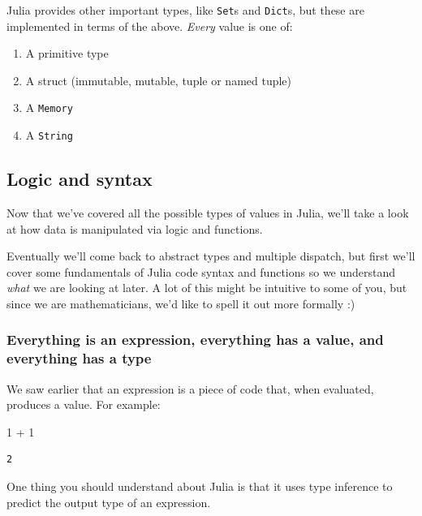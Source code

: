 \documentclass[
]{article}
\newenvironment{Shaded}{\begin{snugshade}}{\end{snugshade}}
\newcommand{\FloatTok}[1]{\textcolor[rgb]{0.68,0.00,0.00}{#1}}
\newcommand{\OperatorTok}[1]{\textcolor[rgb]{0.37,0.37,0.37}{#1}}
\providecommand{\tightlist}{%
  \setlength{\itemsep}{0pt}\setlength{\parskip}{0pt}}
\begin{document}
Julia provides other important types, like \texttt{Set}s and
\texttt{Dict}s, but these are implemented in terms of the above.
\emph{Every} value is one of:

\begin{enumerate}
\def\labelenumi{\arabic{enumi}.}
\tightlist
\item
  A primitive type
\item
  A struct (immutable, mutable, tuple or named tuple)
\item
  A \texttt{Memory}
\item
  A \texttt{String}
\end{enumerate}

\subsection{Logic and syntax}\label{logic-and-syntax}

Now that we've covered all the possible types of values in Julia, we'll
take a look at how data is manipulated via logic and functions.

Eventually we'll come back to abstract types and multiple dispatch, but
first we'll cover some fundamentals of Julia code syntax and functions
so we understand \emph{what} we are looking at later. A lot of this
might be intuitive to some of you, but since we are mathematicians, we'd
like to spell it out more formally :)

\subsubsection{Everything is an expression, everything has a value, and
everything has a
type}\label{everything-is-an-expression-everything-has-a-value-and-everything-has-a-type}

We saw earlier that an expression is a piece of code that, when
evaluated, produces a value. For example:

\begin{Shaded}
\begin{Highlighting}[]
\FloatTok{1} \OperatorTok{+} \FloatTok{1}
\end{Highlighting}
\end{Shaded}

\begin{verbatim}
2
\end{verbatim}

One thing you should understand about Julia is that it uses type
inference to predict the output type of an expression.
\end{document}
